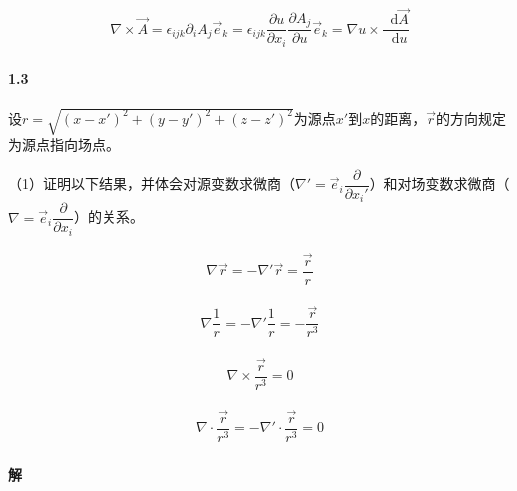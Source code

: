 \documentclass{article}
\newcommand*{\md}{\mathop{}\!\mathrm{d}}
\begin{document}
\begin{equation*}
  \begin{aligned}
    \nabla \times \vec{A} = \epsilon_{ijk} \partial_i A_j \vec{e}_k = \epsilon_{ijk} \dfrac{\partial u}{\partial x_i} \dfrac{\partial A_j}{\partial u} \vec{e}_k = \nabla u \times \dfrac{\md \vec{A}}{\md u}  
  \end{aligned}
\end{equation*}

\paragraph{1.3}

设$r=\sqrt{\left( x - x' \right)^2 + \left( y - y' \right)^2 + \left( z - z' \right)^2}$为源点$x'$到$x$的距离，$\vec{r}$的方向规定为源点指向场点。

（1）证明以下结果，并体会对源变数求微商（$\nabla' = \vec{e}_i \dfrac{\partial}{\partial x_i'} $）和对场变数求微商（$\nabla = \vec{e}_i \dfrac{\partial }{\partial x_i} $）的关系。

\begin{equation*}
  \begin{aligned}
    \nabla \vec{r} = - \nabla' \vec{r} = \dfrac{\vec{r}}{r} 
  \end{aligned}
\end{equation*}

\begin{equation*}
  \begin{aligned}
    \nabla \dfrac{1}{r} = - \nabla' \dfrac{1}{r} = - \dfrac{\vec{r}}{r^3}   
  \end{aligned}
\end{equation*}

\begin{equation*}
  \begin{aligned}
    \nabla \times \dfrac{\vec{r}}{r^3} = 0 
  \end{aligned}
\end{equation*}

\begin{equation*}
  \begin{aligned}
    \nabla \cdot \dfrac{\vec{r}}{r^3} = - \nabla' \cdot \dfrac{\vec{r}}{r^3} = 0  
  \end{aligned}
\end{equation*}

\paragraph{解}
\end{document}
